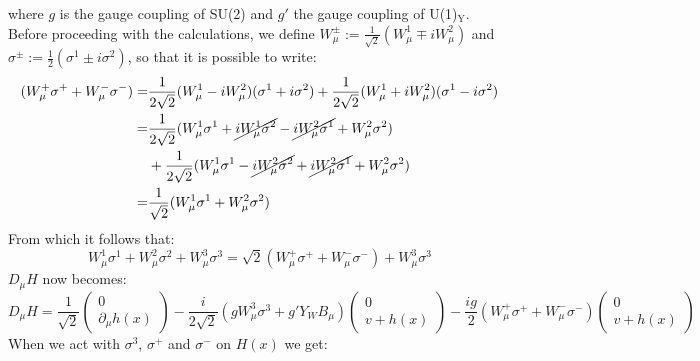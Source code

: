 \documentclass[../main.tex]{subfiles}
\begin{document}
where $g$ is the gauge coupling of SU(2) and $g'$ the gauge coupling of U(1)$_{\text{Y}}$.\\
Before proceeding with the calculations, we define $W_\mu^\pm:=\frac{1}{\sqrt{2}}(W_\mu^1\mp iW_\mu^2)$ and $\sigma^\pm:=\frac{1}{2}(\sigma^1\pm i\sigma^2)$, so that it is possible to write:
\begin{align*}
(W_\mu^+\sigma^++W_\mu^-\sigma^-)=&\frac{1}{2\sqrt{2}}(W_\mu^1-iW_\mu^2)(\sigma^1+i\sigma^2)+\frac{1}{2\sqrt{2}}(W_\mu^1+iW_\mu^2)(\sigma^1-i\sigma^2)\\
=&\frac{1}{2\sqrt{2}}(W_\mu^1\sigma^1+\cancel{iW_\mu^1\sigma^2}-\cancel{iW_\mu^2\sigma^1}+W_\mu^2\sigma^2)\\
&+\frac{1}{2\sqrt{2}}(W_\mu^1\sigma^1-\cancel{iW_\mu^2\sigma^2}+\cancel{iW_\mu^2\sigma^1}+W_\mu^2\sigma^2)\\
=&\frac{1}{\sqrt{2}}(W_\mu^1\sigma^1+W_\mu^2\sigma^2)
\end{align*}
From which it follows that:
\[
W_\mu^1\sigma^1+W_\mu^2\sigma^2+W_\mu^3\sigma^3=\sqrt{2}(W_\mu^+\sigma^++W_\mu^-\sigma^-)+W_\mu^3\sigma^3
\]
$D_\mu H$ now becomes:
\[
D_\mu H=\frac{1}{\sqrt{2}}\begin{pmatrix}0 \\ \partial_\mu h(x)\end{pmatrix}-\frac{i}{2\sqrt{2}}(gW_\mu^3\sigma^3+g'Y_WB_\mu)\begin{pmatrix}0 \\ v+h(x)\end{pmatrix}-\frac{ig}{2}(W_\mu^+\sigma^++W_\mu^-\sigma^-)\begin{pmatrix}0 \\ v+h(x)\end{pmatrix}
\]
When we act with $\sigma^3$, $\sigma^+$ and $\sigma^-$ on $H(x)$ we get:
\end{document}
